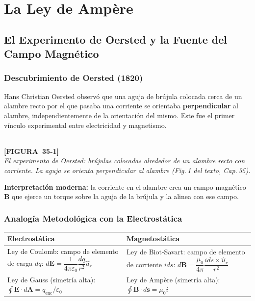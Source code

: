 \documentclass[12pt, letterpaper]{report}
\numberwithin{equation}{section}
\newcommand{\vB}[1]{\boldsymbol{#1}}          %
\newcommand{\figplaceholder}[2]{%
  \begin{tcolorbox}[figbox]
    \centering
    \textcolor{NavyBlue!50}{\rule{0pt}{2.8cm}}\\[4pt]
    {\small\color{NavyBlue}\textbf{[FIGURA\ #1]}\\[2pt]
    \textit{#2}}
  \end{tcolorbox}
}
\begin{document}
\chapter{La Ley de Amp\`{e}re}

\section{El Experimento de Oersted y la Fuente del Campo Magnético}

\subsection{Descubrimiento de Oersted (1820)}

Hans Christian Oersted observó que una aguja de brújula colocada cerca de un
alambre recto por el que pasaba una corriente se orientaba
\textbf{perpendicular} al alambre, independientemente de la orientación del
mismo. Este fue el primer vínculo experimental entre electricidad y magnetismo.

\figplaceholder{35-1}{El experimento de Oersted: brújulas colocadas alrededor de
un alambre recto con corriente. La aguja se orienta perpendicular al alambre
(Fig.\,1 del texto, Cap.\,35).}

\textbf{Interpretación moderna:} la corriente en el alambre crea un campo
magnético $\vB{B}$ que ejerce un torque sobre la aguja de la brújula y la
alinea con ese campo.

\subsection{Analogía Metodológica con la Electrostática}

\begin{center}
\renewcommand{\arraystretch}{1.5}
\begin{tabular}{p{}p{}}
  \toprule
  \textbf{Electrostática} & \textbf{Magnetostática} \\
  \midrule
  Ley de Coulomb: campo de elemento de carga $dq$:
  $d\vB{E}=\dfrac{1}{4\pi\varepsilon_0}\dfrac{dq}{r^2}\hat{u}_r$
  &
  Ley de Biot-Savart: campo de elemento de corriente $ids$:
  $d\vB{B}=\dfrac{\mu_0}{4\pi}\dfrac{ids\times\hat{u}_r}{r^2}$
  \\[8pt]
  Ley de Gauss (simetría alta): $\oint\vB{E}\cdot d\vB{A}=q_\text{enc}/\varepsilon_0$
  &
  Ley de Ampère (simetría alta): $\oint\vB{B}\cdot d\vB{s}=\mu_0 i$
  \\
  \bottomrule
\end{tabular}
\end{center}
\end{document}
